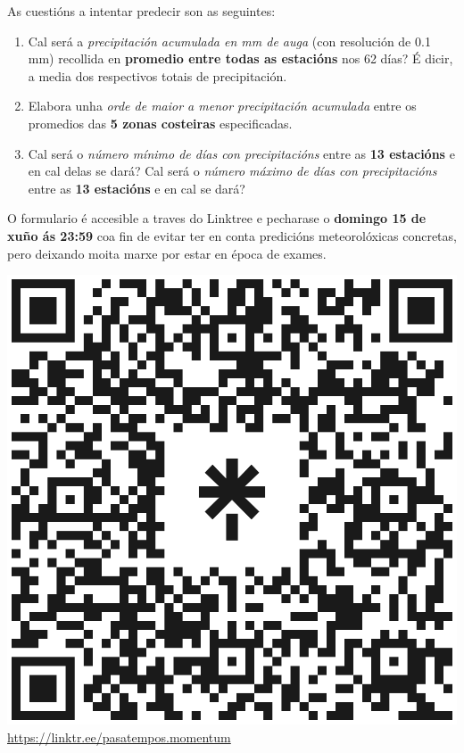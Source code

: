 \begin{multicols}{2}
\vspace{4px}
As cuestións a intentar predecir son as seguintes:
\vspace{-4px}
\begin{enumerate}
	\item Cal será a \textit{precipitación acumulada en mm de auga} (con resolución de 0.1 mm) recollida en \textbf{promedio entre todas as estacións} nos 62 días? É dicir, a media dos respectivos totais de precipitación.
	\item Elabora unha \textit{orde de maior a menor precipitación acumulada} entre os promedios das \textbf{5 zonas costeiras} especificadas.
	\item Cal será o \textit{número mínimo de días con precipitacións} entre as \textbf{13 estacións} e en cal delas se dará? Cal será o \textit{número máximo de días con precipitacións} entre as \textbf{13 estacións} e en cal se dará?
\end{enumerate}
 
O formulario é accesible a traves do Linktree e pecharase o \textbf{domingo 15 de xuño ás 23:59} coa fin de evitar ter en conta predicións meteorolóxicas concretas, pero deixando moita marxe por estar en época de exames.

\begin{center}
    \includegraphics[width=0.4\linewidth]{revistas/002/imaxes/pasatempos_momentum.png}
    \url{https://linktr.ee/pasatempos.momentum}
\end{center}

\end{multicols}